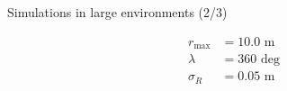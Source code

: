 \begin{frame}[noframenumbering]{Simulations in large environments (2/3)}

  \begin{overlayarea}{\textwidth}{\textheight}
    \leavevmode
    \begin{minipage}{0.15\textwidth}\vspace{-2cm}
      \begin{align}
        r_{\max} &= 10.0 \text{ m} \nonumber \\
        \lambda &= 360 \text{ deg} \nonumber \\
        \sigma_R &= 0.05 \text{ m} \nonumber
      \end{align}
    \end{minipage}%
      \begin{minipage}{.85\textwidth}
      \begin{figure}
        \centering
        \begin{subfigure}{0.45\textwidth}
          \centering
          
        \end{subfigure}%
        \begin{subfigure}{0.45\textwidth}\hspace{-0.2cm}
          
        \end{subfigure}
      \end{figure}
    \end{minipage}
  \end{overlayarea}

\end{frame}
